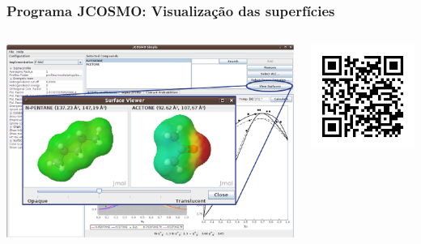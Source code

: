 \documentclass[aspectratio=169]{beamer}
\begin{document}
\begin{frame}
  \frametitle{Programa JCOSMO: Visualização das superfícies}
	\begin{columns}[t]
		\begin{center}
			\includegraphics[width=1\textwidth]{img/jcosmo2}
		\end{center}
	
		\begin{center}
			\includegraphics[width=1\textwidth]{img/jcosmo_qr}
		\end{center}
	\end{columns}
\end{frame}
\end{document}

